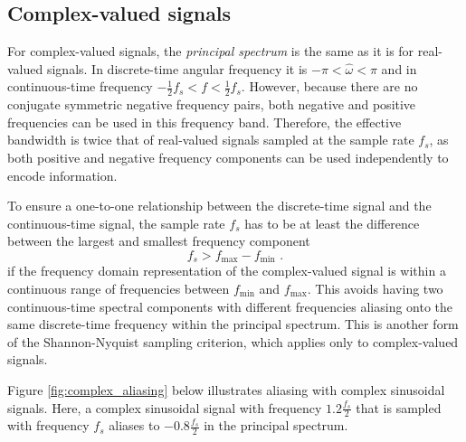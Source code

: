 \subsection{Complex-valued signals}
For complex-valued signals, the \emph{principal spectrum} is the same as it is for real-valued signals. In discrete-time angular frequency it is $-\pi<\hat{\omega}<\pi$ and in continuous-time frequency $-\frac{1}{2}f_s<f<\frac{1}{2}f_s$. However, because there are no conjugate symmetric negative frequency pairs, both negative and positive frequencies can be used in this frequency band. Therefore, the effective bandwidth is twice that of real-valued signals sampled at the sample rate $f_s$, as both positive and negative frequency components can be used independently to encode information.

To ensure a one-to-one relationship between the discrete-time signal and the continuous-time signal, the sample rate $f_s$ has to be at least the difference between the largest and smallest frequency component
\begin{equation}
  \boxed{
    f_s > f_{\mathrm{max}}-f_{\mathrm{min}}
    }\,\,.
\end{equation}
if the frequency domain representation of the complex-valued signal is within a continuous range of frequencies between $f_{\mathrm{min}}$ and $f_{\mathrm{max}}$. This avoids having two continuous-time spectral components with different frequencies aliasing onto the same discrete-time frequency within the principal spectrum. 
This is another form of the Shannon-Nyquist sampling criterion, which applies only to complex-valued signals.

Figure \ref{fig:complex_aliasing} below illustrates aliasing with complex sinusoidal signals. Here, a complex sinusoidal signal with frequency $1.2\frac{f_s}{2}$ that is sampled with frequency $f_s$ aliases to $-0.8\frac{f_s}{2}$ in the principal spectrum.


